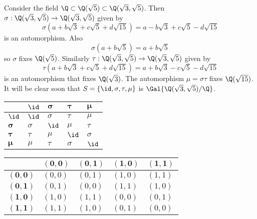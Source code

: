 \begin{example}\label{example-galois-group-of-Q-sqrt3-sqrt5-over-Q}
    Consider the field $\Q \subset \Q(\sqrt5) \subset \Q(\sqrt3, \sqrt5)$. Then $\sigma: \Q(\sqrt3,\sqrt5) \to \Q(\sqrt3,\sqrt5)$ given by
    \[
        \sigma(a + b\sqrt3 + c\sqrt5 + d\sqrt{15}) = a - b\sqrt3 + c\sqrt5 - d\sqrt{15}
    \]
    is an automorphism. Also
    \[
        \sigma(a + b\sqrt{5}) = a+b\sqrt5
    \]
    so $\sigma$ fixes $\Q(\sqrt5)$. Similarly $\tau: \Q(\sqrt3,\sqrt5)\to\Q(\sqrt3,\sqrt5)$ given by
    \[
        \tau(a + b\sqrt3 + c\sqrt5 + d\sqrt{15}) = a + b\sqrt3 - c\sqrt5 - d\sqrt{15}
    \]
    is an automorphism that fixes $\Q(\sqrt3)$. The automorphism $\mu = \sigma\tau$ fixes $\Q(\sqrt{15})$. It will be clear soon that $S = \{\id, \sigma, \tau, \mu\}$ is $\Gal{\Q(\sqrt3,\sqrt5)/\Q}$.

    \begin{minipage}[c]{0.475\textwidth}
        \begin{table}[H]
            \centering
            \begin{tabular}{|l|l|l|l|l|}
                \hline
                & $\boldsymbol{\id}$ & $\boldsymbol{\sigma}$ & $\boldsymbol{\tau}$ & $\boldsymbol{\mu}$ \\ \hline
                $\boldsymbol{\id}$ & $\id$ & $\sigma$ & $\tau$ & $\mu$ \\ \hline
                $\boldsymbol{\sigma}$ & $\sigma$ & $\id$ & $\mu$ & $\tau$ \\ \hline
                $\boldsymbol{\tau}$ & $\tau$ & $\mu$ & $\id$ & $\sigma$ \\ \hline
                $\boldsymbol{\mu}$ & $\mu$ & $\tau$ & $\sigma$ & $\id$ \\ \hline
            \end{tabular}
        \end{table}
    \end{minipage}
    \begin{minipage}[c]{0.475\textwidth}
        \begin{table}[H]
            \centering
            \begin{tabular}{|l|l|l|l|l|}
                \hline
                & $\boldsymbol{(0, 0)}$ & $\boldsymbol{(0, 1)}$ & $\boldsymbol{(1, 0)}$ & $\boldsymbol{(1, 1)}$ \\ \hline
                $\boldsymbol{(0, 0)}$ & $(0, 0)$ & $(0, 1)$ & $(1, 0)$ & $(1, 1)$ \\ \hline
                $\boldsymbol{(0, 1)}$ & $(0, 1)$ & $(0, 0)$ & $(1, 1)$ & $(1, 0)$ \\ \hline
                $\boldsymbol{(1, 0)}$ & $(1, 0)$ & $(1, 1)$ & $(0, 0)$ & $(0, 1)$ \\ \hline
                $\boldsymbol{(1, 1)}$ & $(1, 1)$ & $(1, 0)$ & $(0, 1)$ & $(0, 0)$ \\ \hline
            \end{tabular}
        \end{table}
    \end{minipage}


\end{example}
